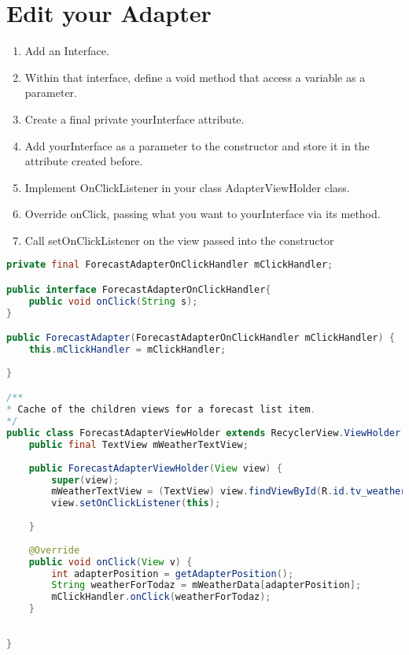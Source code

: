\documentclass[12pt]{article} %
\begin{document}

\section{Edit your Adapter}

\begin{enumerate}
	\item Add an Interface.
	\item Within that interface, define a void method that access a variable as a parameter.
	\item Create a final private yourInterface attribute.
	\item  Add yourInterface as a parameter to the constructor and store it in the attribute created before.
	\item Implement OnClickListener in your class AdapterViewHolder class.
	\item  Override onClick, passing what you want to yourInterface via its method.
	\item Call setOnClickListener on the view passed into the constructor
\end{enumerate}

\begin{lstlisting}[language=Java]
private final ForecastAdapterOnClickHandler mClickHandler;

public interface ForecastAdapterOnClickHandler{
	public void onClick(String s);
}

public ForecastAdapter(ForecastAdapterOnClickHandler mClickHandler) {
	this.mClickHandler = mClickHandler;
	
}

/**
* Cache of the children views for a forecast list item.
*/
public class ForecastAdapterViewHolder extends RecyclerView.ViewHolder implements View.OnClickListener{
	public final TextView mWeatherTextView;
	
	public ForecastAdapterViewHolder(View view) {
		super(view);
		mWeatherTextView = (TextView) view.findViewById(R.id.tv_weather_data);
		view.setOnClickListener(this);
		
	}
	
	@Override
	public void onClick(View v) {
		int adapterPosition = getAdapterPosition();
		String weatherForTodaz = mWeatherData[adapterPosition];
		mClickHandler.onClick(weatherForTodaz);
	}
	
	
}

\end{lstlisting}
\end{document}
